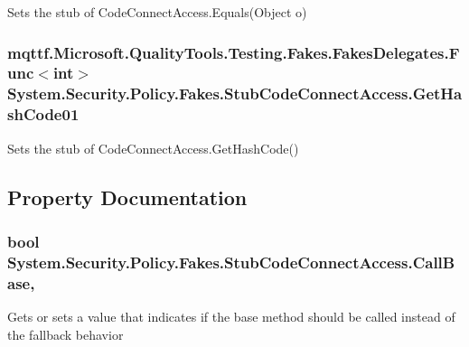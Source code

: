 Sets the stub of Code\-Connect\-Access.\-Equals(\-Object o)

\hypertarget{class_system_1_1_security_1_1_policy_1_1_fakes_1_1_stub_code_connect_access_a91d07aefeaf8d62abe41d85edda0fad9}{
\subsubsection[{Get\-Hash\-Code01}]{\setlength{\rightskip}{0pt plus 5cm}mqttf.\-Microsoft.\-Quality\-Tools.\-Testing.\-Fakes.\-Fakes\-Delegates.\-Func$<$int$>$ System.\-Security.\-Policy.\-Fakes.\-Stub\-Code\-Connect\-Access.\-Get\-Hash\-Code01}}\label{class_system_1_1_security_1_1_policy_1_1_fakes_1_1_stub_code_connect_access_a91d07aefeaf8d62abe41d85edda0fad9}


Sets the stub of Code\-Connect\-Access.\-Get\-Hash\-Code()



\subsection{Property Documentation}
\hypertarget{class_system_1_1_security_1_1_policy_1_1_fakes_1_1_stub_code_connect_access_a75f66891835d4a8757ce93dfce0bde3e}{
\subsubsection[{Call\-Base}]{\setlength{\rightskip}{0pt plus 5cm}bool System.\-Security.\-Policy.\-Fakes.\-Stub\-Code\-Connect\-Access.\-Call\-Base\hspace{0.3cm}{\ttfamily [get]}, {\ttfamily [set]}}}\label{class_system_1_1_security_1_1_policy_1_1_fakes_1_1_stub_code_connect_access_a75f66891835d4a8757ce93dfce0bde3e}


Gets or sets a value that indicates if the base method should be called instead of the fallback behavior

